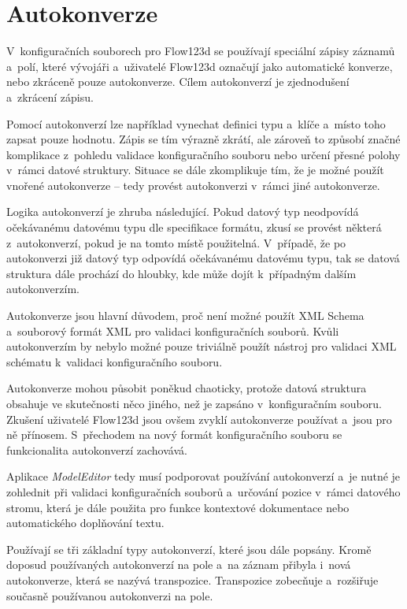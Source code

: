 \documentclass[FM,bw,DP]{tulthesis}
\begin{document}
\section{Autokonverze}
\label{sec:analyza-autokonverze}

V~konfiguračních souborech pro Flow123d se používají speciální zápisy záznamů a~polí, které vývojáři a~uživatelé Flow123d označují jako automatické konverze, nebo zkráceně pouze autokonverze. Cílem autokonverzí je zjednodušení a~zkrácení zápisu.

Pomocí autokonverzí lze například vynechat definici typu a~klíče a~místo toho zapsat pouze hodnotu. Zápis se tím výrazně zkrátí, ale zároveň to způsobí značné komplikace z~pohledu validace konfiguračního souboru nebo určení přesné polohy v~rámci datové struktury. Situace se dále zkomplikuje tím, že je možné použít vnořené autokonverze -- tedy provést autokonverzi v~rámci jiné autokonverze.

Logika autokonverzí je zhruba následující. Pokud datový typ neodpovídá o\-če\-ká\-va\-né\-mu datovému typu dle specifikace formátu, zkusí se provést některá z~autokonverzí, pokud je na tomto místě použitelná. V~případě, že po autokonverzi již datový typ odpovídá očekávanému datovému typu, tak se datová struktura dále prochází do hloubky, kde může dojít k~případným dalším autokonverzím.

Autokonverze jsou hlavní důvodem, proč není možné použít \gls{XML} Schema a~souborový formát \gls{XML} pro validaci konfiguračních souborů. Kvůli autokonverzím by nebylo možné pouze triviálně použít nástroj pro validaci \gls{XML} schématu k~validaci konfiguračního souboru.

Autokonverze mohou působit poněkud chaoticky, protože datová struktura obsahuje ve skutečnosti něco jiného, než je zapsáno v~konfiguračním souboru. Zkušení uživatelé Flow123d jsou ovšem zvyklí autokonverze používat a~jsou pro ně přínosem. S~přechodem na nový formát konfiguračního souboru se funkcionalita autokonverzí zachovává.

Aplikace \textit{ModelEditor} tedy musí podporovat používání autokonverzí a~je nutné je zohlednit při validaci konfiguračních souborů a~určování pozice v~rámci datového stromu, která je dále použita pro funkce kontextové dokumentace nebo automatického doplňování textu. 

Používají se tři základní typy autokonverzí, které jsou dále popsány. Kromě doposud používaných autokonverzí na pole a~na záznam přibyla i~nová autokonverze, která se nazývá transpozice. Transpozice zobecňuje a~rozšiřuje současně používanou autokonverzi na pole.
\end{document}

